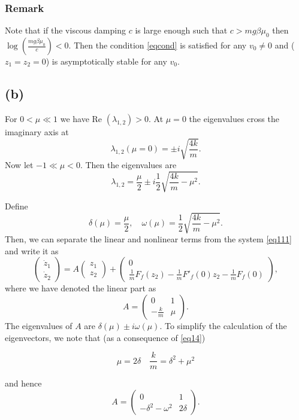 \documentclass[twoside,10pt,a4paper]{article}
\begin{document}
\subsubsection*{Remark}
Note that if the viscous damping $c$ is large enough such that $c>mg\beta \mu_0$ then $\log\left(\frac{mg\beta \mu_0}{c} \right)<0$. Then the condition \eqref{eqcond} is satisfied for any $v_0\neq 0$ and ($z_1=z_2=0$) is asymptotically stable for any $v_0$.
\subsection*{(b)}
For $0<\mu \ll 1$ we have Re $(\lambda_{1,2})>0$. At $\mu=0$ the eigenvalues cross the imaginary axis at 
$$
\lambda_{1,2}(\mu=0)=\pm i \sqrt{\frac{4k}{m}}.
$$
Now let $-1\ll\mu< 0$. Then the eigenvalues are 
$$
\lambda_{1,2}=\frac{\mu}{2}\pm i\frac{1}{2} \sqrt{\frac{4k}{m}-\mu^2}.
$$

Define 
\begin{equation}
\label{eq14}
\boxed{\delta(\mu)=\frac{\mu}{2}, \quad \omega(\mu)=\frac{1}{2}\sqrt{\frac{4k}{m}-\mu^2}.}
\end{equation}
Then, we can separate the linear and nonlinear terms from the system \eqref{eq111} and write it as
\begin{equation}
\label{transf}
\begin{pmatrix} \dot{z}_1 \\ \dot{z}_2 \end{pmatrix} = A\begin{pmatrix} z_1 \\ z_2 \end{pmatrix} + \begin{pmatrix} 0 \\ \frac{1}{m}F_f(z_2)-\frac{1}{m}F'_f(0)z_2 - \frac{1}{m}F_f(0)\end{pmatrix},
\end{equation}
where we have denoted the linear part as $$A=\begin{pmatrix} 0 & 1 \\ -\frac{k}{m} & \mu \end{pmatrix}.$$ The eigenvalues of $A$ are $\delta(\mu)\pm i \omega(\mu)$. To simplify the calculation of the eigenvectors, we note that  (as a consequence of \eqref{eq14})

$$
\mu = 2\delta \quad \frac{k}{m} = \delta^2 + \mu^2
$$

and hence
$$
A=\begin{pmatrix}0 & 1 \\ -\delta^2 -\omega^2 & 2\delta  \end{pmatrix}.
$$
\end{document}
